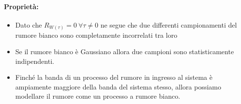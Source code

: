             \paragraph{Proprietà:}
            \begin{itemize}
                \item {Dato che $R_{W(\tau)}=0\ \forall \tau\neq 0$ ne segue che due differenti campionamenti del rumore bianco sono completamente
                incorrelati tra loro}
                \item {
                    Se il rumore bianco è Gaussiano allora due campioni sono statisticamente indipendenti.
                }
                \item {
                    Finché la banda di un processo del rumore in ingresso al sistema è ampiamente maggiore della banda del sistema stesso, allora possiamo modellare
                    il rumore come un processo a rumore bianco.
                }
            \end{itemize}
